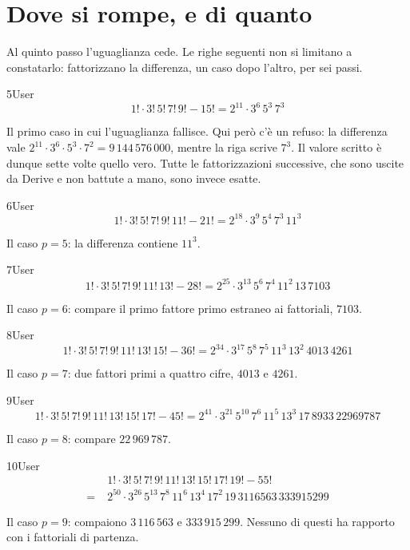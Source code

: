 \section{Dove si rompe, e di quanto}

Al quinto passo l'uguaglianza cede. Le righe seguenti non si limitano a constatarlo: fattorizzano la differenza, un caso dopo l'altro, per sei passi.

\begin{espr}{5}{User}{}
\[
1! \cdot 3!\, 5!\, 7!\, 9! - 15! = 2^{11} \cdot 3^{6}\, 5^{3}\, 7^{3}
\]
\end{espr}
Il primo caso in cui l'uguaglianza fallisce. Qui però c'è un refuso: la differenza vale $2^{11}\cdot3^{6}\cdot5^{3}\cdot7^{2}=9\,144\,576\,000$, mentre la riga scrive $7^{3}$. Il valore scritto è dunque sette volte quello vero. Tutte le fattorizzazioni successive, che sono uscite da Derive e non battute a mano, sono invece esatte.

\begin{espr}{6}{User}{\verificata}
\[
1! \cdot 3!\, 5!\, 7!\, 9!\, 11! - 21! = 2^{18} \cdot 3^{9}\, 5^{4}\, 7^{3}\, 11^{3}
\]
\end{espr}
Il caso $p=5$: la differenza contiene $11^3$.

\begin{espr}{7}{User}{\verificata}
\[
1! \cdot 3!\, 5!\, 7!\, 9!\, 11!\, 13! - 28! = 2^{25} \cdot 3^{13}\, 5^{6}\, 7^{4}\, 11^{2}\, 13\, 7103
\]
\end{espr}
Il caso $p=6$: compare il primo fattore primo estraneo ai fattoriali, $7103$.

\begin{espr}{8}{User}{\verificata}
\[
1! \cdot 3!\, 5!\, 7!\, 9!\, 11!\, 13!\, 15! - 36! = 2^{34} \cdot 3^{17}\, 5^{8}\, 7^{5}\, 11^{3}\, 13^{2}\, 4013\, 4261
\]
\end{espr}
Il caso $p=7$: due fattori primi a quattro cifre, $4013$ e $4261$.

\begin{espr}{9}{User}{\verificata}
\[
1! \cdot 3!\, 5!\, 7!\, 9!\, 11!\, 13!\, 15!\, 17! - 45! = 2^{41} \cdot 3^{21}\, 5^{10}\, 7^{6}\, 11^{5}\, 13^{3}\, 17\, 8933\, 22969787
\]
\end{espr}
Il caso $p=8$: compare $22\,969\,787$.

\begin{espr}{10}{User}{\verificata}
\begin{align*}
& 1! \cdot 3!\, 5!\, 7!\, 9!\, 11!\, 13!\, 15!\, 17!\, 19! - 55! \\
=\;& 2^{50} \cdot 3^{26}\, 5^{13}\, 7^{8}\, 11^{6}\, 13^{4}\, 17^{2}\, 19\, 3116563\, 333915299
\end{align*}
\end{espr}
Il caso $p=9$: compaiono $3\,116\,563$ e $333\,915\,299$. Nessuno di questi ha rapporto con i fattoriali di partenza.

